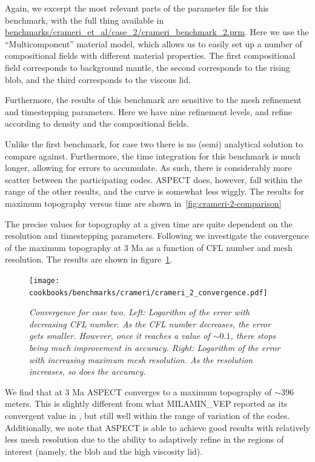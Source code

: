 \documentclass{article}
\newcommand{\aspect}{\textsc{ASPECT}}
\begin{document}
Again, we excerpt the most relevant parts of the parameter file for this benchmark, with the 
full thing available in \url{benchmarks/crameri_et_al/case_2/crameri_benchmark_2.prm}.
Here we use the ``Multicomponent'' material model, which allows us to easily set up a number 
of compositional fields with different material properties. The first compositional field 
corresponds to background mantle, the second corresponds to the rising blob, and the third 
corresponds to the viscous lid.


Furthermore, the results of this benchmark are sensitive to the mesh refinement and timestepping 
parameters. Here we have nine refinement levels, and refine according to density and the 
compositional fields.



Unlike the first benchmark, for case two there is no (semi) analytical solution to compare against.
Furthermore, the time integration for this benchmark is much longer, allowing for errors to 
accumulate. As such, there is considerably more scatter between the participating codes.  \aspect{}
does, however, fall within the range of the other results, and the curve is somewhat less wiggly.
The results for maximum topography versus time are shown in~\ref{fig:crameri-2-comparison}

The precise values for topography at a given time are quite dependent on the resolution and
timestepping parameters. Following \cite{CSG12} we investigate the convergence of the maximum 
topography at 3 Ma as a function of CFL number and mesh resolution.  The results are shown in 
figure~\ref{fig:crameri-benchmark-convergence}. 

\begin{figure}
  \begin{center}
    \texttt{[image: cookbooks/benchmarks/crameri/crameri\_2\_convergence.pdf]}
  \end{center}
  \caption{\it Convergence for case two.  Left: Logarithm of the error with decreasing CFL number. 
As the CFL number decreases, the error gets smaller. However, once it reaches a value of $\sim0.1$, there
stops being much improvement in accuracy. Right: Logarithm of the error with increasing maximum mesh 
resolution. As the resolution increases, so does the accuracy.}
  \label{fig:crameri-benchmark-convergence}
\end{figure}

We find that at 3 Ma \aspect{}  converges to a maximum topography of $\sim$396 meters. 
This is slightly different from what MILAMIN\_VEP reported as its convergent value in \cite{CSG12},
but still well within the range of variation of the codes. Additionally, we note that \aspect{}
is able to achieve good results with relatively less mesh resolution due to the ability 
to adaptively refine in the regions of interest (namely, the blob and the high viscosity lid).
\end{document}

